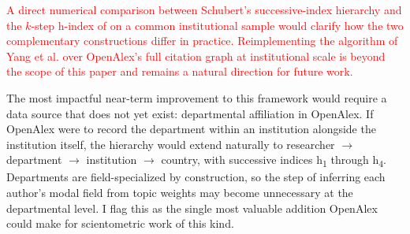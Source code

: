 \textcolor{red}{A direct numerical comparison between Schubert's successive-index hierarchy and the $k$-step h-index of \cite{yang2023} on a common institutional sample would clarify how the two complementary constructions differ in practice. Reimplementing the algorithm of Yang et al. over OpenAlex's full citation graph at institutional scale is beyond the scope of this paper and remains a natural direction for future work.}

The most impactful near-term improvement to this framework would require a data source that does not yet exist: departmental affiliation in OpenAlex. If OpenAlex were to record the department within an institution alongside the institution itself, the hierarchy would extend naturally to researcher $\to$ department $\to$ institution $\to$ country, with successive indices h\textsubscript{1} through h\textsubscript{4}. Departments are field-specialized by construction, so the step of inferring each author's modal field from topic weights may become unnecessary at the departmental level. I flag this as the single most valuable addition OpenAlex could make for scientometric work of this kind.